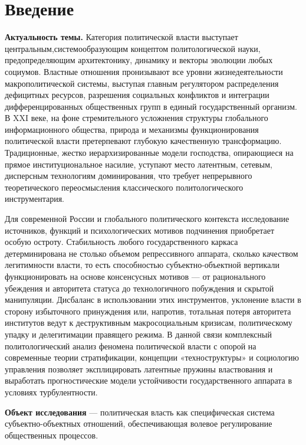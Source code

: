 \section*{Введение}

\textbf{Актуальность темы.} Категория политической власти выступает центральным,системообразующим концептом политологической науки, предопределяющим архитектонику, динамику и векторы эволюции любых социумов. Властные отношения пронизывают все уровни жизнедеятельности макрополитической системы, выступая главным регулятором распределения дефицитных ресурсов, разрешения социальных конфликтов и интеграции дифференцированных общественных групп в единый государственный организм. В XXI веке, на фоне стремительного усложнения структуры глобального информационного общества, природа и механизмы функционирования политической власти претерпевают глубокую качественную трансформацию. Традиционные, жестко иерархизированные модели господства, опирающиеся на прямое институциональное насилие, уступают место латентным, сетевым, дисперсным технологиям доминирования, что требует непрерывного теоретического переосмысления классического политологического инструментария.

Для современной России и глобального политического контекста исследование источников, функций и психологических мотивов подчинения приобретает особую остроту. Стабильность любого государственного каркаса детерминирована не столько объемом репрессивного аппарата, сколько качеством легитимности власти, то есть способностью субъектно-объектной вертикали функционировать на основе консенсусных мотивов — от рационального убеждения и авторитета статуса до технологичного побуждения и скрытой манипуляции. Дисбаланс в использовании этих инструментов, уклонение власти в сторону избыточного принуждения или, напротив, тотальная потеря авторитета институтов ведут к деструктивным макросоциальным кризисам, политическому упадку и делегитимации правящего режима. В данной связи комплексный политологический анализ феномена политической власти с опорой на современные теории стратификации, концепции «техноструктуры» и социологию управления позволяет эксплицировать латентные пружины властвования и выработать прогностические модели устойчивости государственного аппарата в условиях турбулентности.

\textbf{Объект исследования} — политическая власть как специфическая система субъектно-объектных отношений, обеспечивающая волевое регулирование общественных процессов.

